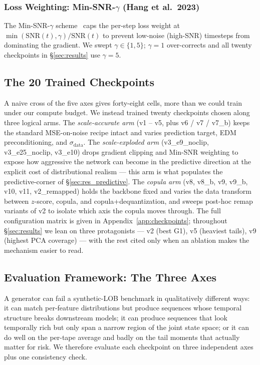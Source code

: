 \documentclass[journal]{IEEEtran}
\theoremstyle{definition}   %
\begin{document}
\subsubsection{Loss Weighting: Min-SNR-$\gamma$ (Hang et al.\ 2023)}
\label{sec:min_snr}

The Min-SNR-$\gamma$ scheme~\cite{hang2023efficient} caps the
per-step loss weight at
$\min(\mathrm{SNR}(t),\gamma)/\mathrm{SNR}(t)$ to prevent low-noise
(high-SNR) timesteps from dominating the gradient. We swept
$\gamma\in\{1, 5\}$; $\gamma{=}1$ over-corrects and all twenty
checkpoints in \S\ref{sec:results} use $\gamma{=}5$.

\subsection{The 20 Trained Checkpoints}
\label{sec:checkpoints}

A naive cross of the five axes gives forty-eight cells, more than we
could train under our compute budget. We instead trained twenty
checkpoints chosen along three logical arms. The \emph{scale-accurate
arm} (v1 -- v5, plus v6 / v7 / v7\_b) keeps the standard MSE-on-noise
recipe intact and varies prediction target, EDM preconditioning, and
$\sigma_{\text{data}}$. The \emph{scale-exploded arm} (v3\_e9\_noclip,
v3\_e25\_noclip, v3\_e10) drops gradient clipping and Min-SNR weighting
to expose how aggressive the network can become in the predictive
direction at the explicit cost of distributional realism --- this arm
is what populates the predictive-corner of \S\ref{sec:res_predictive}.
The \emph{copula arm} (v8, v8\_b, v9, v9\_b, v10, v11, v2\_remapped)
holds the backbone fixed and varies the data transform between
$z$-score, copula, and copula+dequantization, and sweeps
post-hoc remap variants of v2 to isolate which axis the copula moves
through. The full configuration matrix is given in
Appendix~\ref{app:checkpoints}; throughout \S\ref{sec:results} we lean
on three protagonists --- v2 (best G1), v5 (heaviest tails), v9
(highest PCA coverage) --- with the rest cited only when an ablation
makes the mechanism easier to read.

\subsection{Evaluation Framework: The Three Axes}
\label{sec:eval_framework}

A generator can fail a synthetic-LOB benchmark in qualitatively different
ways: it can match per-feature distributions but produce sequences whose
temporal structure breaks downstream models; it can produce sequences
that look temporally rich but only span a narrow region of the joint
state space; or it can do well on the per-tape average and badly on the
tail moments that actually matter for risk. We therefore evaluate each
checkpoint on three independent axes plus one consistency check.
\end{document}
